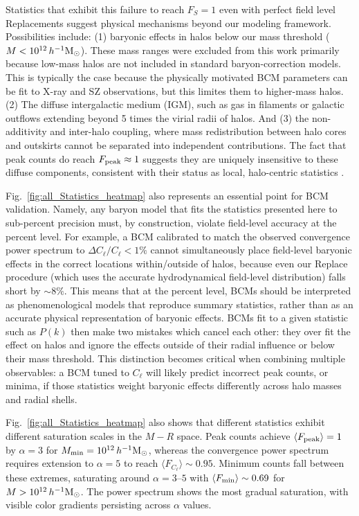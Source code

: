 \documentclass[linenumbers,trackchanges]{aastex701}
\begin{document}
Statistics that exhibit this failure to reach $F_S = 1$ even with perfect field level Replacements suggest physical mechanisms beyond our modeling framework. Possibilities include: (1) baryonic effects in halos below our mass threshold ($M < 10^{12}\,h^{-1}{\rm M}_\odot$). These mass ranges were excluded from this work primarily because low-mass halos are not included in standard baryon-correction models. This is typically the case because the physically motivated BCM parameters can be fit to X-ray and SZ observations, but this limites them to higher-mass halos. (2) The diffuse intergalactic medium (IGM), such as gas in filaments or galactic outflows extending beyond 5 times the virial radii of halos. And (3) the non-additivity and inter-halo coupling, where mass redistribution between halo cores and outskirts cannot be separated into independent contributions. The fact that peak counts do reach $F_{\rm peak} \approx 1$ suggests they are uniquely insensitive to these diffuse components, consistent with their status as local, halo-centric statistics \citep{Yang-13, liu16}.

Fig.~\ref{fig:all_Statistics_heatmap} also represents an essential point for BCM validation. Namely, any baryon model that fits the statistics presented here to sub-percent precision must, by construction, violate field-level accuracy at the percent level. For example, a BCM calibrated to match the observed convergence power spectrum to $\Delta C_\ell / C_\ell < 1\%$ cannot simultaneously place field-level baryonic effects in the correct locations within/outside of halos, because even our Replace procedure (which uses the accurate hydrodynamical field-level distribution) falls short by $\sim 8\%$. This means that at the percent level, BCMs should be interpreted as phenomenological models that reproduce summary statistics, rather than as an accurate physical representation of baryonic effects. BCMs fit to a given statistic such as $P(k)$ then make two mistakes which cancel each other: they over fit the effect on halos and ignore the effects outside of their radial influence or below their mass threshold. This distinction becomes critical when combining multiple observables: a BCM tuned to $C_\ell$ will likely predict incorrect peak counts, or minima, if those statistics weight baryonic effects differently across halo masses and radial shells.

Fig.~\ref{fig:all_Statistics_heatmap} also shows that different statistics exhibit different saturation scales in the $M-R$ space. Peak counts achieve $\langle F_{\rm peak} \rangle =1$ by $\alpha = 3$ for $M_{\min} = 10^{12}\,h^{-1}{\rm M}_\odot$, whereas the convergence power spectrum requires extension to $\alpha = 5$ to reach $\langle F_{C_\ell} \rangle \sim 0.95$. Minimum counts fall between these extremes, saturating around $\alpha = 3$–$5$ with $\langle F_{\rm min} \rangle \sim 0.69$ for $M>10^{12}\,h^{-1}{\rm M}_\odot$. The power spectrum shows the most gradual saturation, with visible color gradients persisting across $\alpha$ values.
\end{document}
